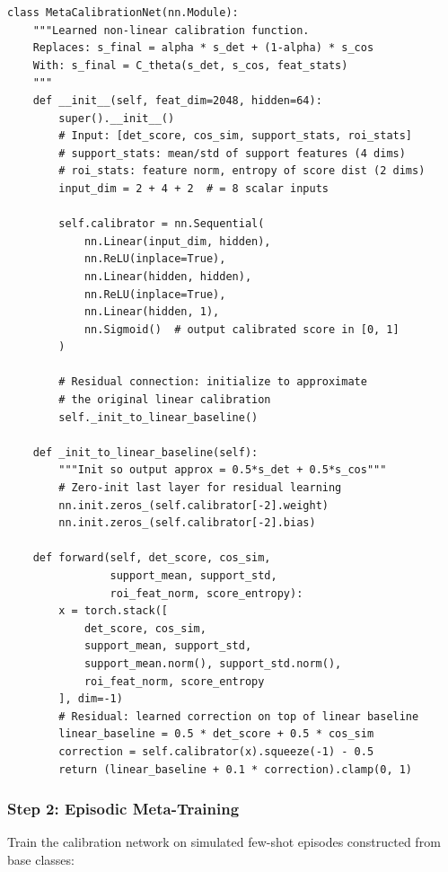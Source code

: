 \documentclass[11pt,a4paper]{article}
\begin{document}
\begin{lstlisting}[caption={Meta-PCB calibration network}]
class MetaCalibrationNet(nn.Module):
    """Learned non-linear calibration function.
    Replaces: s_final = alpha * s_det + (1-alpha) * s_cos
    With: s_final = C_theta(s_det, s_cos, feat_stats)
    """
    def __init__(self, feat_dim=2048, hidden=64):
        super().__init__()
        # Input: [det_score, cos_sim, support_stats, roi_stats]
        # support_stats: mean/std of support features (4 dims)
        # roi_stats: feature norm, entropy of score dist (2 dims)
        input_dim = 2 + 4 + 2  # = 8 scalar inputs

        self.calibrator = nn.Sequential(
            nn.Linear(input_dim, hidden),
            nn.ReLU(inplace=True),
            nn.Linear(hidden, hidden),
            nn.ReLU(inplace=True),
            nn.Linear(hidden, 1),
            nn.Sigmoid()  # output calibrated score in [0, 1]
        )

        # Residual connection: initialize to approximate
        # the original linear calibration
        self._init_to_linear_baseline()

    def _init_to_linear_baseline(self):
        """Init so output approx = 0.5*s_det + 0.5*s_cos"""
        # Zero-init last layer for residual learning
        nn.init.zeros_(self.calibrator[-2].weight)
        nn.init.zeros_(self.calibrator[-2].bias)

    def forward(self, det_score, cos_sim,
                support_mean, support_std,
                roi_feat_norm, score_entropy):
        x = torch.stack([
            det_score, cos_sim,
            support_mean, support_std,
            support_mean.norm(), support_std.norm(),
            roi_feat_norm, score_entropy
        ], dim=-1)
        # Residual: learned correction on top of linear baseline
        linear_baseline = 0.5 * det_score + 0.5 * cos_sim
        correction = self.calibrator(x).squeeze(-1) - 0.5
        return (linear_baseline + 0.1 * correction).clamp(0, 1)
\end{lstlisting}

\subsubsection{Step 2: Episodic Meta-Training}

Train the calibration network on simulated few-shot episodes constructed from base classes:
\end{document}

